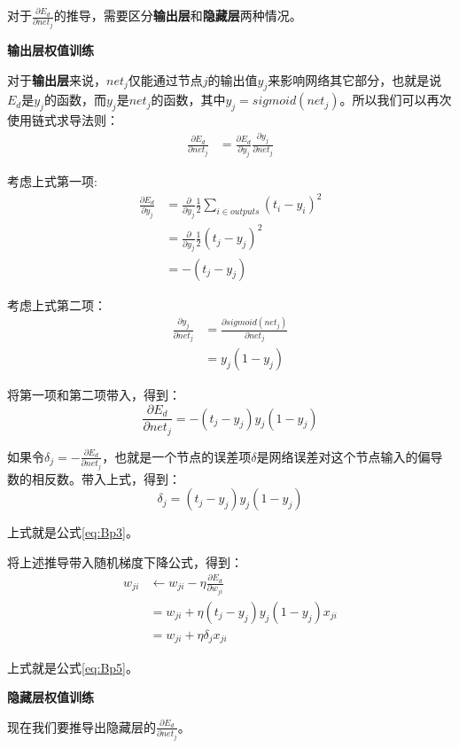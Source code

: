 对于\(\frac{\partial{E_d}}{\partial{net_j}}\)的推导，需要区分\textbf{输出层}和\textbf{隐藏层}两种情况。


\textbf{输出层权值训练}

对于\textbf{输出层}来说，\(net_j\)仅能通过节点\(j\)的输出值\(y_j\)来影响网络其它部分，也就是说\(E_d\)是\(y_j\)的函数，而\(y_j\)是\(net_j\)的函数，其中\(y_j=sigmoid(net_j)\)。所以我们可以再次使用链式求导法则：
\begin{align*}
	\frac{\partial{E_d}}{\partial{net_j}} & =\frac{\partial{E_d}}{\partial{y_j}}\frac{\partial{y_j}}{\partial{net_j}}
\end{align*}


考虑上式第一项:
\begin{align*}
	\frac{\partial{E_d}}{\partial{y_j}} & =\frac{\partial}{\partial{y_j}}\frac{1}{2}\sum_{i\in outputs}(t_i-y_i)^2 \\
	                                    & =\frac{\partial}{\partial{y_j}}\frac{1}{2}(t_j-y_j)^2                    \\
	                                    & =-(t_j-y_j)
\end{align*}


考虑上式第二项：
\begin{align*}
	\frac{\partial{y_j}}{\partial{net_j}} & =\frac{\partial sigmoid(net_j)}{\partial{net_j}} \\
	                                      & =y_j(1-y_j)
\end{align*}


将第一项和第二项带入，得到：
\[
	\frac{\partial{E_d}}{\partial{net_j}}=-(t_j-y_j)y_j(1-y_j)
\]

如果令\(\delta_j=-\frac{\partial{E_d}}{\partial{net_j}}\)，也就是一个节点的误差项\(\delta\)是网络误差对这个节点输入的偏导数的相反数。带入上式，得到：
\[
	\delta_j=(t_j-y_j)y_j(1-y_j)
\]

上式就是公式\ref{eq:Bp3}。

将上述推导带入随机梯度下降公式，得到：
\begin{align*}
	w_{ji} & \gets w_{ji}-\eta\frac{\partial{E_d}}{\partial{w_{ji}}} \\
	       & =w_{ji}+\eta(t_j-y_j)y_j(1-y_j)x_{ji}                   \\
	       & =w_{ji}+\eta\delta_jx_{ji}
\end{align*}


上式就是公式\ref{eq:Bp5}。

\textbf{隐藏层权值训练}

现在我们要推导出隐藏层的\(\frac{\partial{E_d}}{\partial{net_j}}\)。

